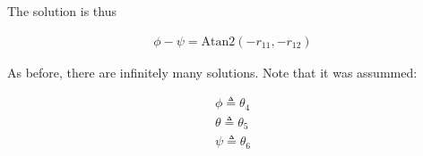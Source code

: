 \documentclass[12pt, a4paper]{article}
\begin{document}
The solution is thus

\begin{align}
\phi - \psi = \mathrm{Atan2}(-r_{11}, -r_{12}) 
\end{align}

As before, there are infinitely many solutions. Note that it was assummed:

\begin{align*}
    \phi \triangleq \theta_4 \\
    \theta \triangleq \theta_5 \\
    \psi \triangleq \theta_6 
\end{align*}

\end{document}
